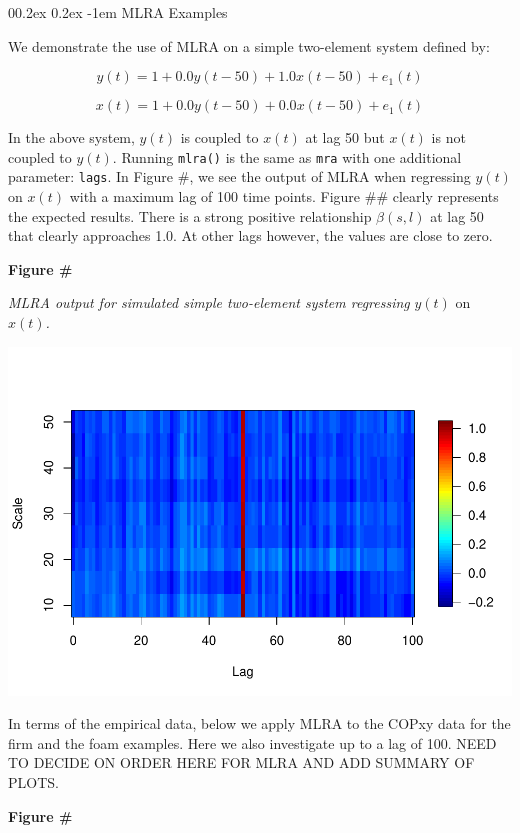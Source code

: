 \documentclass[
  man]{apa6}
\makeatletter
\let\oldparagraph\paragraph
\renewcommand{\paragraph}[1]{\oldparagraph{#1}\mbox{}}
\renewcommand{\paragraph}{\@startsection{paragraph}{4}{\parindent}%
  {0\baselineskip \@plus 0.2ex \@minus 0.2ex}%
  {-1em}%
  {\normalfont\normalsize\bfseries\itshape\typesectitle}}
\makeatother
\begin{document}
\hypertarget{mlra-examples}{%
\paragraph{MLRA Examples}\label{mlra-examples}}

We demonstrate the use of MLRA on a simple two-element system defined
by:

\[
y(t)=1+0.0y(t-50)+1.0x(t-50)+e_1(t)
\]

\[
x(t)=1+0.0y(t-50)+0.0x(t-50)+e_1(t)
\]

In the above system, \(y(t)\) is coupled to \(x(t)\) at lag 50 but \(x(t)\) is
not coupled to \(y(t)\). Running \texttt{mlra()} is the same as \texttt{mra} with one
additional parameter: \texttt{lags}. In Figure \#, we see the output of MLRA
when regressing \(y(t)\) on \(x(t)\) with a maximum lag of 100 time points.
Figure \#\# clearly represents the expected results. There is a strong
positive relationship \(\beta(s,l)\) at lag 50 that clearly approaches
1.0. At other lags however, the values are close to zero.

\textbf{Figure \#}

\emph{MLRA output for simulated simple two-element system regressing} \(y(t)\)
on \(x(t)\)\emph{.}

\includegraphics{fractal_regression_paper_brm_files/figure-latex/unnamed-chunk-26-1.pdf}

In terms of the empirical data, below we apply MLRA to the COPxy data
for the firm and the foam examples. Here we also investigate up to a lag
of 100. NEED TO DECIDE ON ORDER HERE FOR MLRA AND ADD SUMMARY OF PLOTS.

\textbf{Figure \#}
\end{document}
